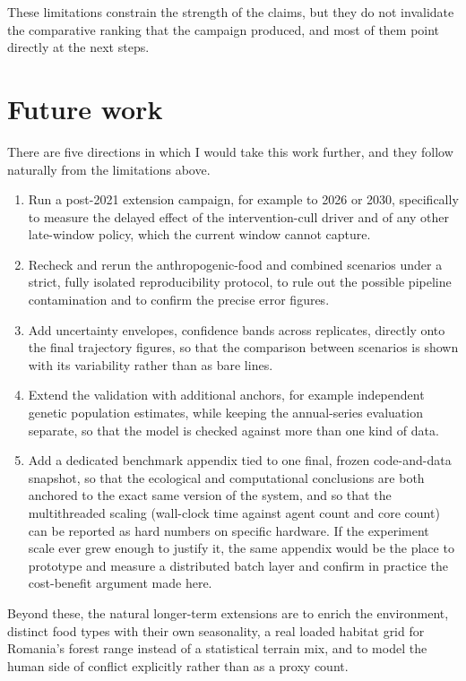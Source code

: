 These limitations constrain the strength of the claims, but they do not invalidate the comparative ranking that the campaign produced, and most of them point directly at the next steps.

\section{Future work}

There are five directions in which I would take this work further, and they follow naturally from the limitations above.

\begin{enumerate}
    \item Run a post-2021 extension campaign, for example to 2026 or 2030, specifically to measure the delayed effect of the intervention-cull driver and of any other late-window policy, which the current window cannot capture.
    \item Recheck and rerun the anthropogenic-food and combined scenarios under a strict, fully isolated reproducibility protocol, to rule out the possible pipeline contamination and to confirm the precise error figures.
    \item Add uncertainty envelopes, confidence bands across replicates, directly onto the final trajectory figures, so that the comparison between scenarios is shown with its variability rather than as bare lines.
    \item Extend the validation with additional anchors, for example independent genetic population estimates, while keeping the annual-series evaluation separate, so that the model is checked against more than one kind of data.
    \item Add a dedicated benchmark appendix tied to one final, frozen code-and-data snapshot, so that the ecological and computational conclusions are both anchored to the exact same version of the system, and so that the multithreaded scaling (wall-clock time against agent count and core count) can be reported as hard numbers on specific hardware. If the experiment scale ever grew enough to justify it, the same appendix would be the place to prototype and measure a distributed batch layer and confirm in practice the cost-benefit argument made here.
\end{enumerate}

Beyond these, the natural longer-term extensions are to enrich the environment, distinct food types with their own seasonality, a real loaded habitat grid for Romania's forest range instead of a statistical terrain mix, and to model the human side of conflict explicitly rather than as a proxy count.

